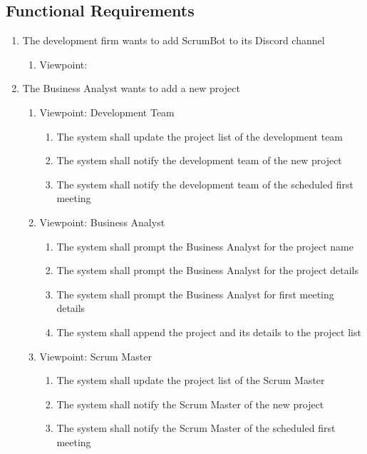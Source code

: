 \documentclass[12pt, titlepage]{article}
\begin{document}
\subsection{Functional Requirements}
\begin{enumerate}[{BE}1.]
    \item The development firm wants to add ScrumBot to its Discord channel
    \begin{enumerate}[{VP}1.]
        \item Viewpoint:
    \end{enumerate}

    \item The Business Analyst wants to add a new project
    \begin{enumerate}[{VP}1.] 
        \item Viewpoint: Development Team
            \begin{enumerate}
                \item The system shall update the project list of the development team
                \item The system shall notify the development team of the new project
                \item The system shall notify the development team of the scheduled first meeting
            \end{enumerate}
        \item Viewpoint: Business Analyst
            \begin{enumerate}
                \item The system shall prompt the Business Analyst for the project name
                \item The system shall prompt the Business Analyst for the project details
                \item The system shall prompt the Business Analyst for first meeting details
                \item The system shall append the project and its details to the project list
            \end{enumerate}
        \item Viewpoint: Scrum Master
            \begin{enumerate}
                \item The system shall update the project list of the Scrum Master
                \item The system shall notify the Scrum Master of the new project
                \item The system shall notify the Scrum Master of the scheduled first meeting
            \end{enumerate}
    \end{enumerate}
\end{enumerate}
\end{document}
